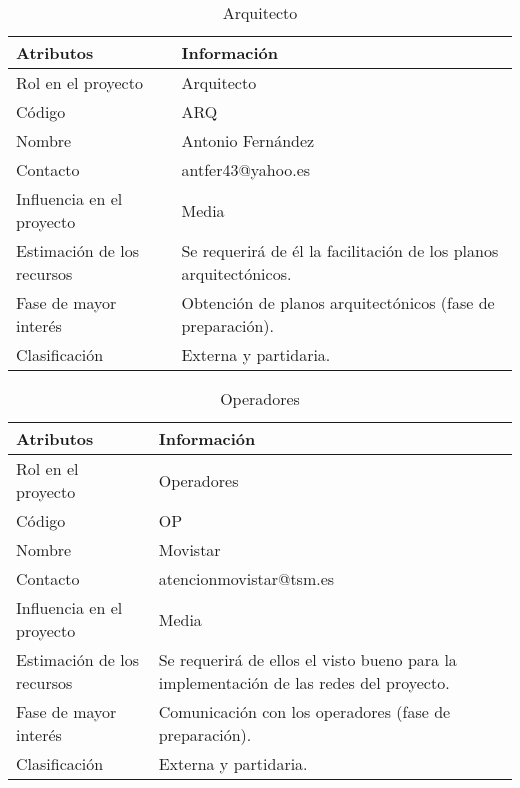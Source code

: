 \begin{table}[H]
\centering
\begin{tabular}{|m{5cm}|m{11cm}| }
\hline
\rowcolor{gray!50} \centering Atributos & Información  \\
\hline
\hline
 Rol en el proyecto & Arquitecto \\
 \hline
 Código & ARQ \\
 \hline
 Nombre & Antonio Fernández \\
\hline
 Contacto & antfer43@yahoo.es \\
\hline
 Influencia en el proyecto & Media \\
\hline
 Estimación de los recursos & Se requerirá de él la facilitación de los planos arquitectónicos. \\
\hline
 Fase de mayor interés & Obtención de planos arquitectónicos (fase de preparación).\\
\hline
Clasificación & Externa y partidaria.\\
 \hline
\end{tabular}
\caption{Arquitecto}
\label{table:ta1}
\end{table}


\begin{table}[H]
\centering
\begin{tabular}{|m{5cm}|m{11cm}| }
\hline
\rowcolor{gray!50} \centering Atributos & Información  \\
\hline
\hline
 Rol en el proyecto & Operadores \\
 \hline
 Código & OP \\
 \hline
 Nombre & Movistar \\
\hline
 Contacto & atencionmovistar@tsm.es \\
\hline
 Influencia en el proyecto & Media \\
\hline
 Estimación de los recursos & Se requerirá de ellos el visto bueno para la implementación de las redes del proyecto. \\
\hline
 Fase de mayor interés & Comunicación con los operadores (fase de preparación).\\
\hline
Clasificación & Externa y partidaria.\\
 \hline
\end{tabular}
\caption{Operadores}
\label{table:ta1}
\end{table}

